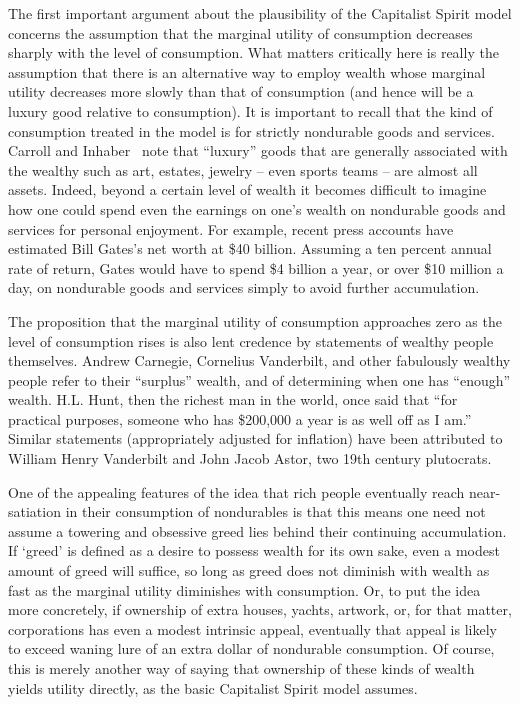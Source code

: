 \documentclass[titlepage,12pt]{article}
\begin{document}
The first important argument about the plausibility of the Capitalist 
Spirit model concerns the assumption that the marginal utility of 
consumption decreases sharply with the level of consumption.  What 
matters critically here is really the assumption that there is an 
alternative way to employ wealth whose marginal utility decreases more 
slowly than that of consumption (and hence will be a luxury good 
relative to consumption).  It is important to recall that the kind of 
consumption treated in the model is for strictly nondurable goods and 
services.  Carroll and Inhaber~\cite{scarrollHowRich} note that 
``luxury'' goods that are generally associated with the wealthy such 
as art, estates, jewelry -- even sports teams -- are almost all 
assets.  Indeed, beyond a certain level of wealth it becomes difficult 
to imagine how one could spend even the earnings on one's wealth on 
nondurable goods and services for personal enjoyment.  For example, 
recent press accounts have estimated Bill Gates's net worth at \$40 
billion.  Assuming a ten percent annual rate of return, Gates would 
have to spend \$4 billion a year, or over \$10 million a day, on 
nondurable goods and services simply to avoid further accumulation.

The proposition that the marginal utility of consumption approaches 
zero as the level of consumption rises is also lent credence by 
statements of wealthy people themselves.  Andrew Carnegie, Cornelius 
Vanderbilt, and other fabulously wealthy people refer to their 
``surplus'' wealth, and of determining when one has ``enough'' wealth.  
H.L. Hunt, then the richest man in the world, once said that ``for 
practical purposes, someone who has \$200,000 a year is as well off as 
I am.''  Similar statements (appropriately adjusted for inflation) 
have been attributed to William Henry Vanderbilt and John Jacob Astor, 
two 19th century plutocrats.

One of the appealing features of the idea that rich people eventually 
reach near-satiation in their consumption of nondurables is that this 
means one need not assume a towering and obsessive greed lies behind 
their continuing accumulation.  If `greed' is defined as a desire to 
possess wealth for its own sake, even a modest amount of greed will 
suffice, so long as greed does not diminish with wealth as fast as the 
marginal utility diminishes with consumption.  Or, to put the idea 
more concretely, if ownership of extra houses, yachts, artwork, or, 
for that matter, corporations has even a modest intrinsic appeal, 
eventually that appeal is likely to exceed waning lure of an extra 
dollar of nondurable consumption.  Of course, this is merely another 
way of saying that ownership of these kinds of wealth yields utility 
directly, as the basic Capitalist Spirit model assumes.
\end{document}
